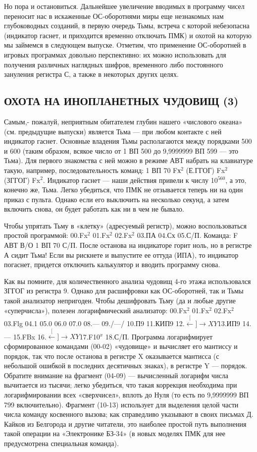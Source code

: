 \documentclass[11pt,a4paper,oneside]{article}
\def\XY{$\stackrel[\leftarrow]{\rightarrow}{XY}$}
\begin{document}
Но пора и остановиться. Дальнейшее увеличение вводимых в программу чисел переносит нас в искаженные ОС-оборотнями миры еще незнакомых нам глубоководных созданий, в первую очередь Тьмы, встреча с которой небезопасна (индикатор гаснет, и приходится временно отключать ПМК) и охотой на которую мы займемся в следующем выпуске. Oтметим, что применение ОС-оборотней в игровых программах довольно перспективно: их можно использовать для получения различных наглядных шифров, временного либо постоянного зануления регистра С, а также в некоторых других целях.


\subsection{ОХОТА НА ИНОПЛАНЕТНЫХ ЧУДОВИЩ (3)}
Самым,- пожалуй, неприятным обитателем глубин нашего «числового океана» (см. предыдущие выпуски) является Тьма — при любом контакте с ней индикатор гаснет. Основные владения Тьмы располагаются между порядками 500 и 600 (таким образом, всякое число от 1 ВП 500 до 9,9999999 ВП 599 — это Тьма). Для первого знакомства с ней можно в режиме АВТ набрать на клавиатуре такую, например, последовательность команд: 1 ВП 70 Fх$^{2}$ (Е.ГГОГ) Fx$^{2}$ (ЗГГОГ) Fx$^{2}$. Индикатор гаснет — наши действия привели к числу 10$^{560}$, а это, конечно же, Тьма. Легко убедиться, что ПМК не отзывается теперь ни на один приказ с пульта. Однако если его выключить на несколько секунд, а затем включить снова, он будет работать как ни в чем не бывало.

Чтобы упрятать Тьму в «клетку» (адресуемый регистр), можно воспользоваться простой программой: 00.Fx$^{2}$ 01.Fx$^{2}$ 02.Fx$^{2}$ 03.ПА 04.Сх 05.С/П. Команда: F АВТ В/О 1 ВП 70 С/П. После останова на индикаторе горит ноль, но в регистре А сидит Тьма! Если вы рискнете и выпустите ее оттуда (ИПА), то индикатор погаснет, придется отключить калькулятор и вводить программу снова.

Как вы помните, для количественного анализа чудовищ 4-го этажа использовался ЗГГОГ из регистра 9. Однако для расшифровки как ОС-оборотней, так и Тьмы такой анализатор непригоден. Чтобы дешифровать Тьму (да и любые другие «суперчисла»), полезен логарифмический анализатор: 00.Fx$^{2}$ 01.Fx$^{2}$ 02.Fx$^{2}$ 03.Flg 04.1 05.0 06.0 07.0 08.— 09./—/ 10.П9 11.КИП9 12.\XY 13.ИП9 14.— 15.FBx 16.\XY 17.F10$^{x}$ 18.С/П. Программа логарифмирует сформированное командами (00-02) «чудовище» и вычисляет его мантиссу и порядок, так что после останова в регистре X оказывается мантисса (с небольшой ошибкой в последних десятичных знаках), в регистре Y — порядок. Обратите внимание на фрагмент (04-09) — вычисленный логарифм числа вычитается из тысячи; легко убедиться, что такая коррекция необходима при логарифмировании всех «сверхчисел», вплоть до Нуля (то есть по 9,9999999 ВП 799 включительно). Фрагмент (10-13) использует для выделения целой части числа команду косвенного вызова; как справедливо указывают в своих письмах Д. Кайков из Белгорода и другие читатели, это наиболее простой путь выполнения такой операции на «Электронике БЗ-34» (в новых моделях ПМК для нее предусмотрена специальная команда).
\end{document}
